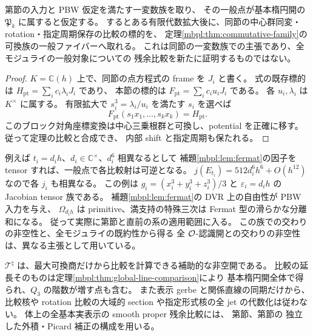\begin{corollary}
\label{mbpl:cor:generic-comparison}
第節の入力と PBW 仮定を満たす一変数族を取り、
その一般点が基本楕円開の $\mathfrak P_k$ に属すると仮定する。
するとある有限代数拡大後に、同節の中心群同変・rotation・指定周期保存の比較の標的を、
定理\ref{mbpl:thm:commutative-family}の可換族の一般ファイバーへ取れる。
これは同節の一変数族での主張であり、全モジュライの一般対象についての
残余比較を新たに証明するものではない。
\end{corollary}

\begin{proof}
$K=\mathbb C(h)$ 上で、同節の点方程式の frame を $J_i$ と書く。
式の既存標的は
$H_{\mathrm{pt}}=\sum_i c_i\lambda_iJ_i$ であり、
本節の標的は $F_{\mathrm{pt}}=\sum_i c_iu_iJ_i$ である。
各 $u_i,\lambda_i$ は $K^\times$ に属する。
有限拡大で $s_i^3=\lambda_i/u_i$ を満たす $s_i$ を選べば
\[
 F_{\mathrm{pt}}(s_1x_1,\ldots,s_kx_k)=H_{\mathrm{pt}}.
\]
このブロック対角座標変換は中心三乗根群と可換し、potential を正確に移す。
従って定理の比較と合成でき、
内部 shift と指定周期も保たれる。
\end{proof}

\begin{remark}[開の非空性と未主張の境界]
例えば $t_i=d_i h$、$d_i\in\mathbb C^\times$、$d_i^6$ 相異なるとして
補題\ref{mbpl:lem:fermat}の因子を tensor すれば、一般点で各比較射は可逆となる。
$j(E_{t_i})=512d_i^6h^6+O(h^{12})$ なので各 $j_i$ も相異なる。
この例は $g_i=(x_i^3+y_i^3+z_i^3)/3$ と
$\varepsilon_i=d_i h$ の Jacobian tensor 族である。
補題\ref{mbpl:lem:fermat}の DVR 上の自由性が PBW 入力を与え、
$\Omega_{d_ih}$ は primitive、満支持の特殊三次は Fermat 型の滑らかな分離和になる。
従って実際に第節と直前の系の適用範囲に入る。
この族での交わりの非空性と、全モジュライの既約性から得る
全 $\mathcal O$-認識開との交わりの非空性は、異なる主張として用いている。

$\mathcal T^\natural$ は、最大可換商だけから比較を計算できる補助的な非空開である。
比較の延長そのものは定理\ref{mbpl:thm:global-line-comparison}により
基本楕円開全体で得られ、$Q_3$ の階数が増す点も含む。
また表示 gerbe と関係直線の同期だけから、
比較核や rotation 比較の大域的 section や指定形式核の全 jet の代数化は従わない。
体上の全基本実表示の smooth proper 残余比較には、
第節、第節の
独立した外積・Picard 補正の構成を用いる。
\end{remark}
